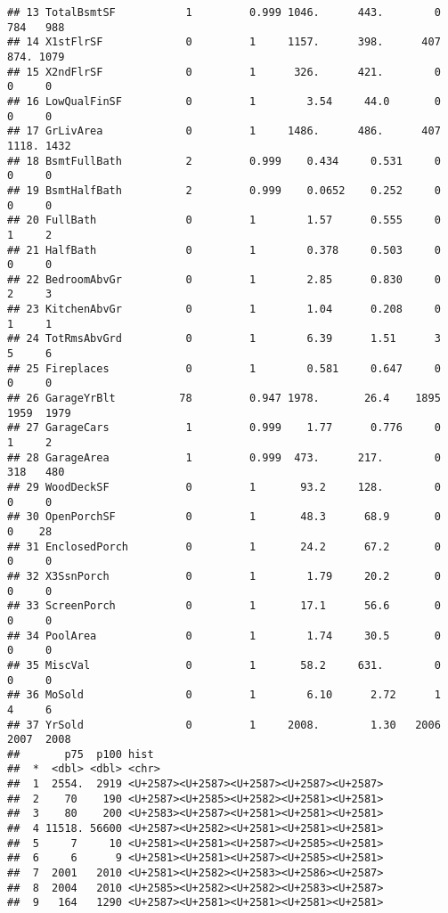 \documentclass[
]{article}
\begin{document}
\begin{verbatim}
## 13 TotalBsmtSF           1         0.999 1046.      443.        0  784   988 
## 14 X1stFlrSF             0         1     1157.      398.      407  874. 1079 
## 15 X2ndFlrSF             0         1      326.      421.        0    0     0 
## 16 LowQualFinSF          0         1        3.54     44.0       0    0     0 
## 17 GrLivArea             0         1     1486.      486.      407 1118. 1432 
## 18 BsmtFullBath          2         0.999    0.434     0.531     0    0     0 
## 19 BsmtHalfBath          2         0.999    0.0652    0.252     0    0     0 
## 20 FullBath              0         1        1.57      0.555     0    1     2 
## 21 HalfBath              0         1        0.378     0.503     0    0     0 
## 22 BedroomAbvGr          0         1        2.85      0.830     0    2     3 
## 23 KitchenAbvGr          0         1        1.04      0.208     0    1     1 
## 24 TotRmsAbvGrd          0         1        6.39      1.51      3    5     6 
## 25 Fireplaces            0         1        0.581     0.647     0    0     0 
## 26 GarageYrBlt          78         0.947 1978.       26.4    1895 1959  1979 
## 27 GarageCars            1         0.999    1.77      0.776     0    1     2 
## 28 GarageArea            1         0.999  473.      217.        0  318   480 
## 29 WoodDeckSF            0         1       93.2     128.        0    0     0 
## 30 OpenPorchSF           0         1       48.3      68.9       0    0    28 
## 31 EnclosedPorch         0         1       24.2      67.2       0    0     0 
## 32 X3SsnPorch            0         1        1.79     20.2       0    0     0 
## 33 ScreenPorch           0         1       17.1      56.6       0    0     0 
## 34 PoolArea              0         1        1.74     30.5       0    0     0 
## 35 MiscVal               0         1       58.2     631.        0    0     0 
## 36 MoSold                0         1        6.10      2.72      1    4     6 
## 37 YrSold                0         1     2008.        1.30   2006 2007  2008 
##       p75  p100 hist 
##  *  <dbl> <dbl> <chr>
##  1  2554.  2919 <U+2587><U+2587><U+2587><U+2587><U+2587>
##  2    70    190 <U+2587><U+2585><U+2582><U+2581><U+2581>
##  3    80    200 <U+2583><U+2587><U+2581><U+2581><U+2581>
##  4 11518. 56600 <U+2587><U+2582><U+2581><U+2581><U+2581>
##  5     7     10 <U+2581><U+2581><U+2587><U+2585><U+2581>
##  6     6      9 <U+2581><U+2581><U+2587><U+2585><U+2581>
##  7  2001   2010 <U+2581><U+2582><U+2583><U+2586><U+2587>
##  8  2004   2010 <U+2585><U+2582><U+2582><U+2583><U+2587>
##  9   164   1290 <U+2587><U+2581><U+2581><U+2581><U+2581>

\end{verbatim}
\end{document}
